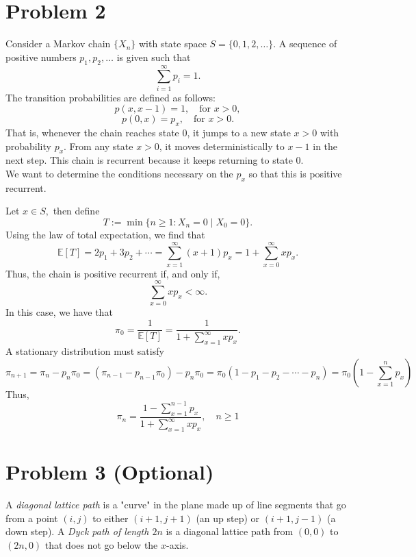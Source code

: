 \documentclass[11pt]{article}
\newcommand{\bbE}{\mathbb{E}}
\begin{document}
\newpage
\section*{Problem 2}
\begin{problem}
    Consider a Markov chain $\{X_n\}$ with state space \( S = \{0, 1, 2, \ldots\} \). A sequence of positive numbers \( p_1, p_2, \ldots \) is given such that
\[
\sum_{i=1}^{\infty} p_i = 1.
\]
The transition probabilities are defined as follows:
\[
p(x, x-1) = 1, \quad \text{for } x > 0,
\]
\[
p(0, x) = p_x, \quad \text{for } x > 0.
\]
That is, whenever the chain reaches state 0, it jumps to a new state \( x > 0 \) with probability \( p_x \). From any state \( x > 0 \), it moves deterministically to \( x-1 \) in the next step. This chain is recurrent because it keeps returning to state 0.
\\
We want to determine the conditions necessary on the $p_x$ so that this is positive recurrent. 
\end{problem}
\begin{solution}
Let $x\in S,$ then define
    \[T:= \min\{n\geq 1 :X_n = 0 \mid X_0 = 0\}.\] Using the law of total expectation, we find that 
\[\bbE[T] = 2p_1 + 3p_2 + \cdots = \sum_{x=1}^\infty (x + 1)p_x = 1 + \sum_{x=0}^\infty x p_x.\] Thus, the chain is positive recurrent if, and only if, 
\[\boxed{\sum_{x= 0}^\infty x p_x < \infty.}\] In this case, we have that 
\[\boxed{\pi_0 = \frac{1}{\bbE[T]} = \frac{1}{1 + \sum_{x=1}^\infty xp_x}.}\] A stationary distribution must satisfy 
\[\pi_{n+1} = \pi_n - p_n \pi_0 = (\pi_{n-1} - p_{n-1}\pi_0) - p_n\pi_0 = \pi_0(1 - p_1 - p_2 - \cdots - p_n) = \pi_0(1 - \sum_{x=1}^{n}p_x)\] Thus, 
\[\boxed{\pi_n = \frac{1 - \sum_{x=1}^{n-1}p_x}{1 + \sum_{x=1}^\infty xp_x}, \quad n\geq 1}\]
\end{solution}

\section*{Problem 3 (Optional)}
A \textit{diagonal lattice path} is a "curve" in the plane made up of line segments that go from a point \((i,j)\) to either \((i+1,j+1)\) (an up step) or \((i+1,j-1)\) (a down step). A \textit{Dyck path of length \(2n\)} is a diagonal lattice path from \((0,0)\) to \((2n,0)\) that does not go below the \(x\)-axis.
\end{document}
